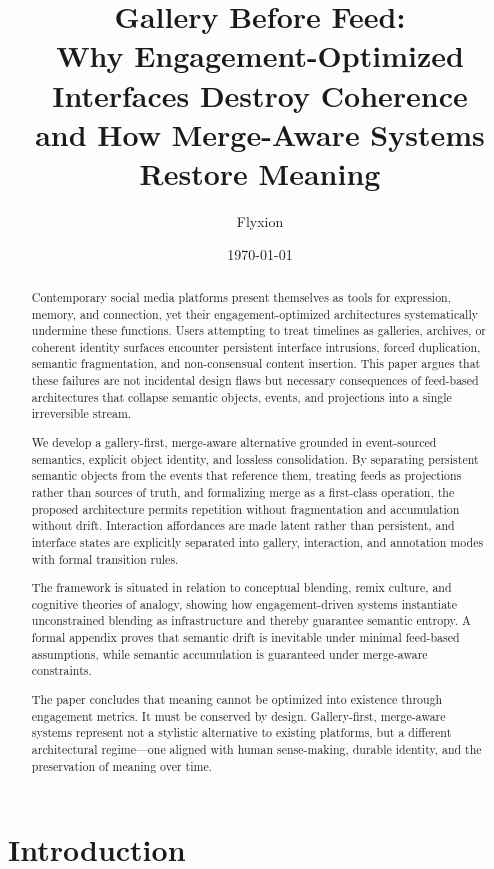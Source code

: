 \documentclass[11pt,oneside]{article}
\title{Gallery Before Feed:\\
Why Engagement-Optimized Interfaces Destroy Coherence\\
and How Merge-Aware Systems Restore Meaning}
\author{Flyxion}
\date{\today}
\begin{document}
\maketitle

\begin{abstract}
Contemporary social media platforms present themselves as tools for expression, memory, and connection, yet their engagement-optimized architectures systematically undermine these functions. Users attempting to treat timelines as galleries, archives, or coherent identity surfaces encounter persistent interface intrusions, forced duplication, semantic fragmentation, and non-consensual content insertion. This paper argues that these failures are not incidental design flaws but necessary consequences of feed-based architectures that collapse semantic objects, events, and projections into a single irreversible stream.

We develop a gallery-first, merge-aware alternative grounded in event-sourced semantics, explicit object identity, and lossless consolidation. By separating persistent semantic objects from the events that reference them, treating feeds as projections rather than sources of truth, and formalizing merge as a first-class operation, the proposed architecture permits repetition without fragmentation and accumulation without drift. Interaction affordances are made latent rather than persistent, and interface states are explicitly separated into gallery, interaction, and annotation modes with formal transition rules.

The framework is situated in relation to conceptual blending, remix culture, and cognitive theories of analogy, showing how engagement-driven systems instantiate unconstrained blending as infrastructure and thereby guarantee semantic entropy. A formal appendix proves that semantic drift is inevitable under minimal feed-based assumptions, while semantic accumulation is guaranteed under merge-aware constraints.

The paper concludes that meaning cannot be optimized into existence through engagement metrics. It must be conserved by design. Gallery-first, merge-aware systems represent not a stylistic alternative to existing platforms, but a different architectural regime—one aligned with human sense-making, durable identity, and the preservation of meaning over time.
\end{abstract}

\section{Introduction}
\end{document}
